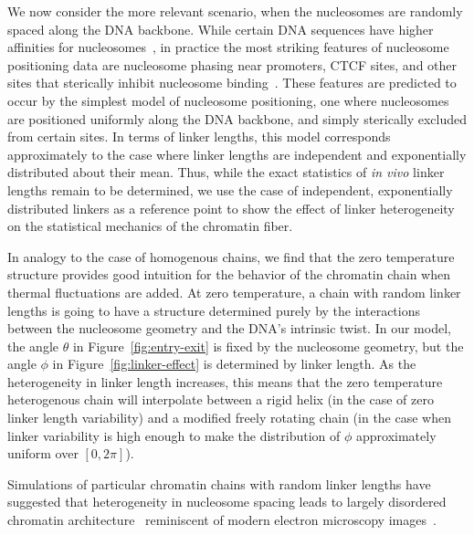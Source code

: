 \documentclass[%
 reprint,
superscriptaddress,
showpacs,preprintnumbers,
 amsmath,amssymb,
 aps,
 prl,
]{revtex4-1}
\begin{document}
We now consider the more relevant scenario, when the nucleosomes are randomly
    spaced along the DNA backbone.
While certain DNA sequences have higher affinities for
    nucleosomes~\cite{something widom}, in practice the most striking features
    of nucleosome positioning data are nucleosome phasing near promoters, CTCF
    sites, and other sites that sterically inhibit nucleosome
    binding~\cite{widom1992}.
These features are predicted to occur by the simplest model of nucleosome
    positioning, one where nucleosomes are positioned uniformly along the DNA
    backbone, and simply sterically excluded from certain sites.
In terms of linker lengths, this model corresponds approximately to the case
    where linker lengths are independent and exponentially distributed about
    their mean.
Thus, while the exact statistics of \textit{in vivo} linker lengths remain to be
    determined, we use the case of independent, exponentially distributed
    linkers as a reference point to show the effect of linker heterogeneity on
    the statistical mechanics of the chromatin fiber.

In analogy to the case of homogenous chains, we find that the zero temperature
    structure provides good intuition for the behavior of the chromatin chain
    when thermal fluctuations are added.
At zero temperature, a chain with random linker lengths is going to have a
    structure determined purely by the interactions between the nucleosome geometry
    and the DNA's intrinsic twist.
In our model, the angle $\theta$ in Figure~\ref{fig:entry-exit} is fixed by the
    nucleosome geometry, but the angle $\phi$ in Figure~\ref{fig:linker-effect}
    is determined by linker length.
As the heterogeneity in linker length increases, this means that the
    zero temperature heterogenous chain will interpolate between a rigid helix
    (in the case of zero linker length variability) and a modified freely
    rotating chain (in the case when linker variability is high enough to make
    the distribution of $\phi$ approximately uniform over $[0, 2\pi]$).

Simulations of particular chromatin chains with random linker lengths have
    suggested that heterogeneity in nucleosome spacing leads to largely
    disordered chromatin architecture~\cite{woodcock1993,
    collepardo-guevara2014, bascom2017a} reminiscent of modern electron
    microscopy images~\cite{ou2017}.
\end{document}
